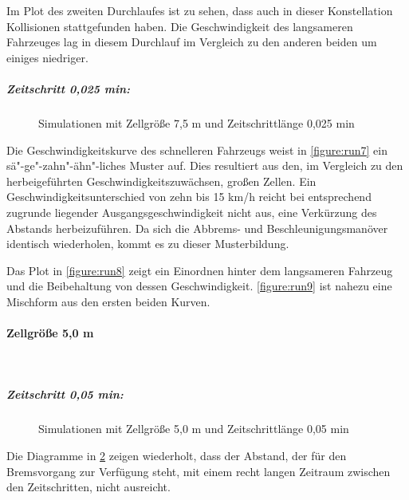 Im Plot des zweiten Durchlaufes ist zu sehen, dass auch in dieser Konstellation Kollisionen stattgefunden haben.
Die Geschwindigkeit des langsameren Fahrzeuges lag in diesem Durchlauf im Vergleich zu den anderen beiden um einiges niedriger.

\subparagraph*{Zeitschritt 0,025 min:}
\begin{figure}[hptb]
  \centering 
   \qquad 
   \qquad 
  \caption{Simulationen mit Zellgröße 7,5 m und Zeitschrittlänge 0,025 min} 
  \label{figure:run7-9}
\end{figure}

Die Geschwindigkeitskurve des schnelleren Fahrzeugs weist in \cref{figure:run7} ein sä"-ge"-zahn"-ähn"-liches Muster auf.
Dies resultiert aus den, im Vergleich zu den herbeigeführten Geschwindigkeitszuwächsen, großen Zellen.
Ein Geschwindigkeitsunterschied von zehn bis 15 km/h reicht bei entsprechend zugrunde liegender Ausgangsgeschwindigkeit nicht aus, eine Verkürzung des Abstands herbeizuführen.
Da sich die Abbrems- und Beschleunigungsmanöver identisch wiederholen, kommt es zu dieser Musterbildung.

Das Plot in \cref{figure:run8} zeigt ein Einordnen hinter dem langsameren Fahrzeug und die Beibehaltung von dessen Geschwindigkeit.
\cref{figure:run9} ist nahezu eine Mischform aus den ersten beiden Kurven.


\paragraph*{Zellgröße 5,0 m}
\hfill \\
\subparagraph*{Zeitschritt 0,05 min:}
\begin{figure}[hptb]
  \centering 
   \qquad 
   \qquad 
  \caption{Simulationen mit Zellgröße 5,0 m und Zeitschrittlänge 0,05 min} 
  \label{figure:run14-16}
\end{figure}

Die Diagramme in \cref{figure:run14-16} zeigen wiederholt, dass der Abstand, der für den Bremsvorgang zur Verfügung steht, mit einem recht langen Zeitraum zwischen den Zeitschritten, nicht ausreicht.

